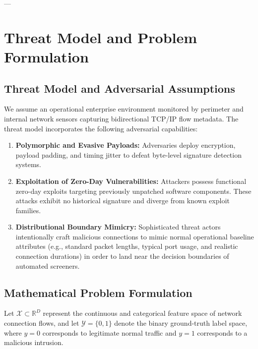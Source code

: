 \documentclass[preprint,12pt]{elsarticle}
\begin{document}
---

\section{Threat Model and Problem Formulation}
\label{sec:formulation}

\subsection{Threat Model and Adversarial Assumptions}
We assume an operational enterprise environment monitored by perimeter and internal network sensors capturing bidirectional TCP/IP flow metadata. The threat model incorporates the following adversarial capabilities:
\begin{enumerate}
    \item \textbf{Polymorphic and Evasive Payloads:} Adversaries deploy encryption, payload padding, and timing jitter to defeat byte-level signature detection systems.
    \item \textbf{Exploitation of Zero-Day Vulnerabilities:} Attackers possess functional zero-day exploits targeting previously unpatched software components. These attacks exhibit no historical signature and diverge from known exploit families.
    \item \textbf{Distributional Boundary Mimicry:} Sophisticated threat actors intentionally craft malicious connections to mimic normal operational baseline attributes (e.g., standard packet lengths, typical port usage, and realistic connection durations) in order to land near the decision boundaries of automated screeners.
\end{enumerate}

\subsection{Mathematical Problem Formulation}
Let $\mathcal{X} \subset \mathbb{R}^D$ represent the continuous and categorical feature space of network connection flows, and let $\mathcal{Y} = \{0, 1\}$ denote the binary ground-truth label space, where $y = 0$ corresponds to legitimate normal traffic and $y = 1$ corresponds to a malicious intrusion. 
\end{document}
